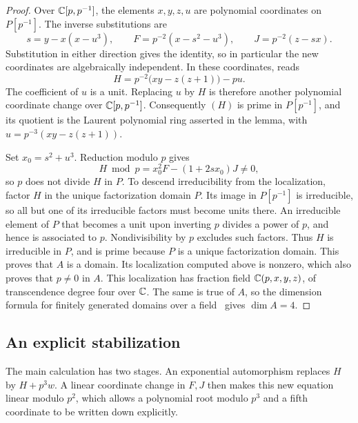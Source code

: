 \begin{proof}
Over \(\mathbb C[p,p^{-1}]\), the elements \(x,y,z,u\) are polynomial
coordinates on \(P[p^{-1}]\). The inverse substitutions are
\begin{equation}\label{con:localized-coordinates}
 s=y-x(x-u^3),\qquad
 F=p^{-2}(x-s^2-u^3),\qquad J=p^{-2}(z-sx).
\end{equation}
Substitution in either direction gives the identity, so in particular
the new coordinates are algebraically independent. In these coordinates,
 reads
\begin{equation}\label{con:localized-h}
 H=p^{-2}\bigl(xy-z(z+1)\bigr)-pu.
\end{equation}
The coefficient of \(u\) is a unit. Replacing \(u\) by \(H\) is therefore
another polynomial coordinate change over \(\mathbb C[p,p^{-1}]\). Consequently
\((H)\) is prime in \(P[p^{-1}]\), and its quotient is the Laurent
polynomial ring asserted in the lemma, with
\(u=p^{-3}(xy-z(z+1))\).

Set \(x_0=s^2+u^3\). Reduction modulo \(p\) gives
\[
 H\bmod p=x_0^2F-(1+2sx_0)J\ne0,
\]
so \(p\) does not divide \(H\) in \(P\). To descend irreducibility from
the localization, factor \(H\) in the unique factorization domain \(P\).
Its image in \(P[p^{-1}]\) is irreducible, so all but one of its
irreducible factors must become units there. An irreducible element of
\(P\) that becomes a unit upon inverting \(p\) divides a power of \(p\),
and hence is associated to \(p\). Nondivisibility by \(p\) excludes such
factors. Thus \(H\) is irreducible in \(P\), and is prime because \(P\)
is a unique factorization domain. This proves that \(A\) is a domain.
Its localization computed above is nonzero, which also proves that
\(p\ne0\) in \(A\). This localization has fraction field
\(\mathbb C(p,x,y,z)\), of transcendence degree four over \(\mathbb C\).
The same is true of \(A\), so the dimension formula for finitely
generated domains over a field~\cite[Tag~00P0]{Stacks} gives \(\dim A=4\).
\end{proof}

\subsection{An explicit stabilization}

The main calculation has two stages. An exponential automorphism
replaces $H$ by $H+p^3w$. A linear coordinate change in $F,J$ then
makes this new equation linear modulo $p^2$, which allows a polynomial
root modulo $p^3$ and a fifth coordinate to be written down explicitly.

